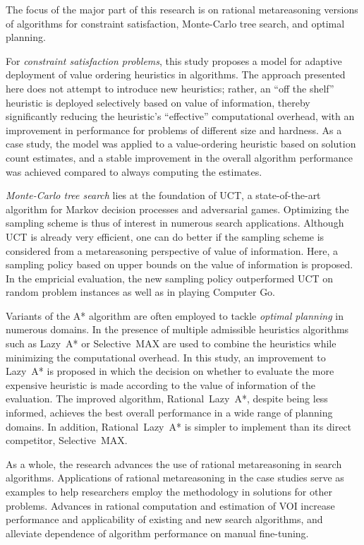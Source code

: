 The focus of the major part of this research is on rational
metareasoning versions of algorithms for constraint satisfaction,
Monte-Carlo tree search, and optimal planning.

For \emph{constraint satisfaction problems}, this study proposes a model for
adaptive deployment of value ordering heuristics in algorithms. The
approach presented here does not attempt to introduce new
heuristics; rather, an ``off the shelf'' heuristic is deployed
selectively based on value of information, thereby significantly
reducing the heuristic's ``effective'' computational overhead, with an
improvement in performance for problems of different size and
hardness. As a case study, the model was applied to a value-ordering
heuristic based on solution count estimates, and a stable improvement
in the overall algorithm performance was achieved compared to always
computing the estimates.

\emph{Monte-Carlo tree search} lies at the foundation of UCT, a
state-of-the-art algorithm for Markov decision processes and
adversarial games. Optimizing the sampling scheme is thus
of interest in numerous search applications. Although UCT is already
very efficient, one can do better if the sampling scheme is considered
from a metareasoning perspective of value of information. Here, a
sampling policy based on upper bounds on the value of information is
proposed. In the empricial evaluation, the new sampling policy 
outperformed UCT on random problem instances as well as in playing
Computer Go. 

Variants of the A* algorithm are often employed to tackle 
\emph{optimal planning} in numerous domains. In the presence of multiple
admissible heuristics algorithms such as Lazy~A* or Selective~MAX
are used to combine the heuristics while minimizing the computational
overhead. In this study, an improvement to Lazy~A* is proposed in
which the decision on whether to evaluate the more expensive heuristic is
made according to the value of information of the evaluation. The
improved algorithm, Rational~Lazy~A*, despite being less informed,
achieves the best overall performance in a wide range of planning
domains. In addition,  Rational~Lazy~A* is simpler to implement than
its direct competitor, Selective~MAX.

As a whole, the research advances the use of rational
metareasoning in search algorithms. Applications of
rational metareasoning in the case studies serve as examples
to help researchers employ the methodology in solutions for other
problems. Advances in rational computation and estimation of VOI increase
performance and applicability of existing and new search algorithms,
and alleviate dependence of algorithm performance on manual
fine-tuning.
